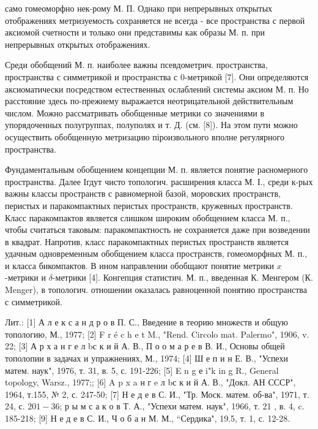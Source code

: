 \documentclass[10pt]{article}
\begin{document}
само гомеоморфно нек-рому М. П. Однако при непрерывных открытых отображениях метризуемость сохраняется не всегда - все пространства с первой аксиомой счетности и толыко они представимы как образы М. п. при непрерывных открытых отображениях.



Среди обобщений М. п. наиболее важны псевдометрич. пространства, пространства с симметрикой и пространства с 0-метрикой [7]. Они определяются аксиоматически посредством естественных ослаблений системы аксиом М. п. Но расстояние здесь по-прежнему выражается неотрицательной действительным числом. Можно рассматривать обобщенные метрики со значениями в упорядоченных полугруппах, полуполях и т. Д. (см. [8]). На этом пути можно осуществить обобщенную метризацию піроизвольного вполне регулярного пространства.



Фундаментальным обобщением концепции М. п. является понятие раєномерного пространства. Далее Ігдут чисто топологич. расширения класса М. І., среди к-рых важны классы пространств с равномерной базой, моровских пространств, перистых и паракомпактных перистых пространств, кружевных пространств. Класс паракомпактов является слишком широким обобщением класса М. п., чтобы считаться таковым: паракомпактность не сохраняется даже при возведении в квадрат. Напротив, класс паракомпактных перистых пространств является удачным одновременным обобщением класса пространств, гомеоморфных М. п., и класса бикомпактов. В ином направлении обобщают понятие метрики $x$-метрики и $\delta$-метрики [4]. Конгепция статистич. М. п., введенная К. Менгером (К. Menger), в топологич. отношении оказалась равноценной понятию пространства с симметрикой.



Лит.: [1] А л е к с а н д р о в П. С., Введение в теорию множеств и общую топологию, М., 1977; [2] F r é c h e t M., "Rend. Circolo mat. Palermo", 1906, v. 22; [3] А р х а н г е л bс к и й А. В., П о о м а р е в В. И., Основы общей тополопии в задачах и упражнениях, М., 1974; [4] Ш е п и н Е. В., "Успехи матем. наук", 1976, т. 31, в. 5, с. 191-226; [5] E $\mathrm{n}$ g е i"k in g R., General topology, Warsz., 1977;; [6] A p x a н г e л bс к и й А. В., "Докл. АН СССР", 1964, т.155, № 2, с. 247-50; [7] Н е д е в С. И., "Тр. Моск. матем. об-ва", 1971, т. 24, с. $201-36$; р ы м с а к о в Т. А., "Успехи матем. наук", 1966, т. 21 , в. 4, c. 185-218; [9] Н е д е в С. И., Ч о б а н М. М., “Сердика", 19.5, т. 1, с. 12-28.
\end{document}
